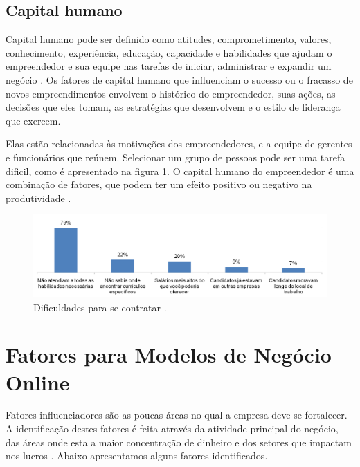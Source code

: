 \subsection{Capital humano}
\label{subsec:framing}

Capital humano pode ser definido como atitudes, comprometimento, valores, conhecimento, experiência, educação, capacidade e habilidades que ajudam o empreendedor e sua equipe nas tarefas de iniciar, administrar e expandir um negócio \cite{raucha.&fresem2000}. Os fatores de capital humano que influenciam o sucesso ou o fracasso de novos empreendimentos envolvem o histórico do empreendedor, suas ações, as decisões que eles tomam, as estratégias que desenvolvem e o estilo de liderança que exercem. 

Elas estão relacionadas às motivações dos empreendedores, e a equipe de gerentes e funcionários que reúnem. Selecionar um grupo de pessoas pode ser uma tarefa dificil, como é apresentado na figura \ref{fig:dificuldadedecontratar}. O capital humano do empreendedor é uma combinação de fatores, que podem ter um efeito positivo ou negativo na produtividade \cite{thandekaruthkunene2008}.

\begin{figure}[hbt!]
 \centering
  \includegraphics[width=1.00\textwidth]{./fig/dificuldadesdecontratar}
 \caption{Dificuldades para se contratar \cite{ecommerceschool2015}.}
 \label{fig:dificuldadedecontratar}
\end{figure}


\section{Fatores para Modelos de Negócio Online}
\label{sec:model}

Fatores influenciadores são as poucas áreas no qual a empresa deve se fortalecer. A identificação destes fatores é feita através da atividade principal do negócio, das áreas onde esta a maior concentração de dinheiro e dos setores que impactam nos lucros \cite{criticalfactors2014}. Abaixo apresentamos alguns fatores identificados.


